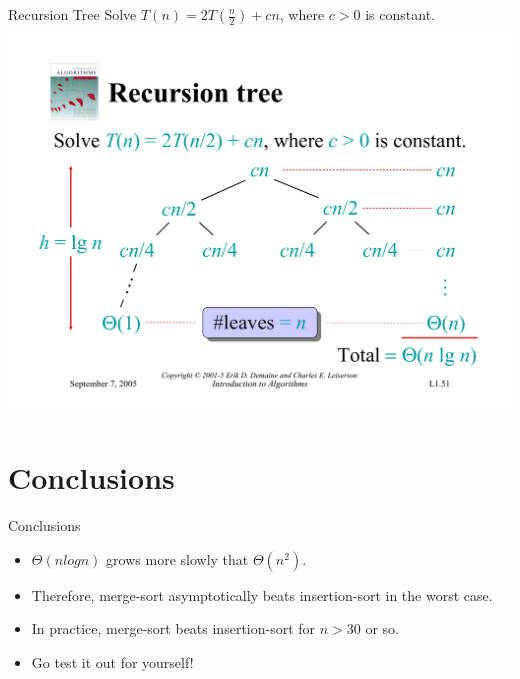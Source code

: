 \documentclass{beamer}
\begin{document}
\begin{frame}{Recursion Tree}
    Solve $T(n) = 2T(\frac{n}{2}) + cn$, where $c > 0$ is constant.\\
    \vspace{5mm}
    \centering
    \includegraphics[width=\textwidth, trim={0.49cm 1.25cm 0.7cm 5.75cm}, clip]{pages/lec1_51}
\end{frame}

\section*{Conclusions}

\begin{frame}{Conclusions}
    \begin{itemize}
        \item $\Theta(n log n)$ grows more slowly that $\Theta(n^2)$.
        \item Therefore, merge-sort asymptotically beats insertion-sort in the worst case.
        \item In practice, merge-sort beats insertion-sort for $n > 30$ or so.
        \item Go test it out for yourself!
    \end{itemize}
\end{frame}
\end{document}
